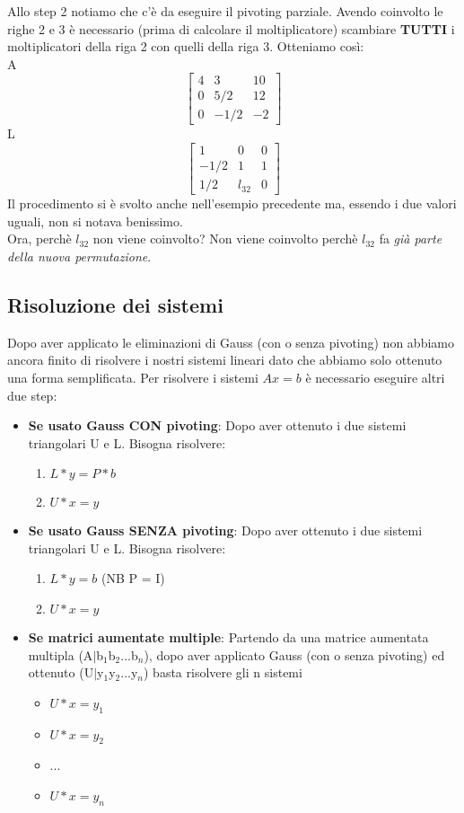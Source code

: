 Allo step 2 notiamo che c'è da eseguire il pivoting parziale. Avendo coinvolto le righe 2 e 3 è necessario (prima di calcolare il moltiplicatore) scambiare \textbf{TUTTI} i moltiplicatori della riga 2 con quelli della riga 3. Otteniamo così: \\
A
$$
\begin{bmatrix}
4 & 3 & 10 \\
0 & 5/2 & 12 \\
0 & -1/2 & -2 
\end{bmatrix}
$$
\noindent
L
$$
\begin{bmatrix}
1 & 0 & 0 \\
- 1/2 & 1 & 1 \\
1/2 & l_{32} & 0 
\end{bmatrix}
$$
\noindent
Il procedimento si è svolto anche nell'esempio precedente ma, essendo i due valori uguali, non si notava benissimo. \\
Ora, perchè $l_{32}$ non viene coinvolto? Non viene coinvolto perchè $l_{32}$ fa \textit{già parte della nuova permutazione}.

\subsection{Risoluzione dei sistemi}
\label{Risoluzione dei sistemi}
Dopo aver applicato le eliminazioni di Gauss (con o senza pivoting) non abbiamo ancora finito di risolvere i nostri sistemi lineari dato che abbiamo solo ottenuto una forma semplificata. Per risolvere i sistemi $Ax = b$ è necessario eseguire altri due step:
\begin{itemize}
\item \textbf{Se usato Gauss CON pivoting}: Dopo aver ottenuto i due sistemi triangolari U e L. Bisogna risolvere:
\begin{enumerate}
\item $L*y = P*b$
\item $U*x = y$
\end{enumerate}
\item \textbf{Se usato Gauss SENZA pivoting}: Dopo aver ottenuto i due sistemi triangolari U e L. Bisogna risolvere:
\begin{enumerate}
\item $L*y = b$ (NB P = I)
\item $U*x = y$
\end{enumerate}
\item \textbf{Se matrici aumentate multiple}: Partendo da una matrice aumentata multipla (A$\mid$b$_1$b$_2$...b$_n$), dopo aver applicato Gauss (con o senza pivoting) ed ottenuto (U$\mid$y$_1$y$_2$...y$_n$) basta risolvere gli n sistemi
\begin{itemize}
\item $U*x = y_1$
\item $U*x = y_2$
\item ...
\item $U*x = y_n$
\end{itemize}
\end{itemize}
\noindent

